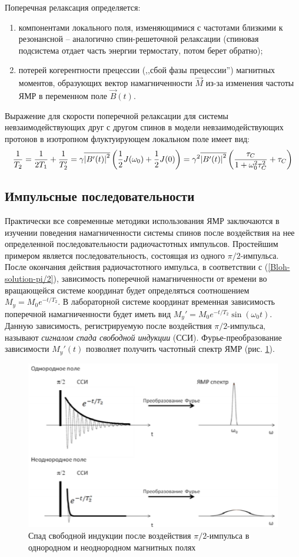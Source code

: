 Поперечная релаксация определяется:
\begin{enumerate}[label=\alph*)]
	\item компонентами локального поля, изменяющимися с частотами близкими к резонансной -- аналогично спин-решеточной релаксации (спиновая подсистема отдает часть энергии термостату, потом берет обратно);
	\item потерей когерентности прецессии (,,сбой фазы прецессии'') магнитных моментов, образующих вектор намагниченности $ \vec{M} $ из-за изменения частоты ЯМР в переменном поле $ \vec{B}(t) $.
\end{enumerate}

Выражение для скорости поперечной релаксации для системы невзаимодействующих друг с другом спинов в модели невзаимодействующих протонов в изотропном флуктуирующем локальном поле имеет вид:
\begin{equation}
\label{T_2-of-J}
\dfrac{1}{T_2} = \dfrac{1}{2 T_1} + \dfrac{1}{T_2'} = \gamma \overline{\left|B'(t)\right|^2} \left(\frac{1}{2} J(\omega_0) + \frac{1}{2} J(0) \right) = \gamma^2 \overline{\left|B'(t)\right|^2} \left(\dfrac{\tau_C}{1 + \omega_0^2 \tau_C^2} + \tau_C \right)
\end{equation}

\subsection{Импульсные последовательности}
Практически все современные методики использования ЯМР заключаются в изучении поведения намагниченности системы спинов после воздействия на нее определенной последовательности радиочастотных импульсов.
Простейшим примером является последовательность, состоящая из одного $\pi /2$-импульса. 
После окончания действия радиочастотного импульса, в соответствии с (\ref{Bloh-solution-pi/2}), зависимость поперечной намагниченности от времени во вращающейся системе координат будет определяться соотношением $M_y = M_0 e^{-t/T_2}$.
В лабораторной системе координат временная зависимость поперечной намагниченности будет иметь вид $ M_y' = M_0 e^{-t/T_2} \sin(\omega_0 t) $. 
Данную зависимость, регистрируемую после воздействия $\pi /2$-импульса, называют \textit{сигналом спада свободной индукции} (ССИ).
Фурье-преобразование зависимости $ M_y' (t) $ позволяет получить частотный спектр ЯМР (рис. \ref{fig:fourier-example}).
\begin{figure}[h]
	\centering
	\includegraphics[width=0.7\linewidth]{Fourier-example}
	\caption{Спад свободной индукции после воздействия $\pi /2$-импульса в однородном и неоднородном магнитных полях}
	\label{fig:fourier-example}
\end{figure}

